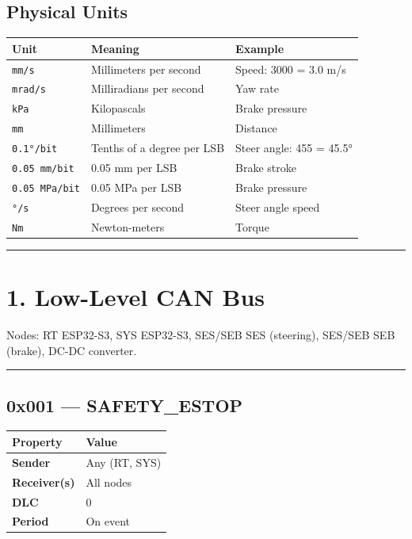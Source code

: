 \subsection{Physical Units}\label{physical-units}

\begin{longtable}[]{@{}lll@{}}
\toprule\noalign{}
Unit & Meaning & Example \\
\midrule\noalign{}
\endhead
\bottomrule\noalign{}
\endlastfoot
\texttt{mm/s} & Millimeters per second & Speed: 3000 = 3.0 m/s \\
\texttt{mrad/s} & Milliradians per second & Yaw rate \\
\texttt{kPa} & Kilopascals & Brake pressure \\
\texttt{mm} & Millimeters & Distance \\
\texttt{0.1°/bit} & Tenths of a degree per LSB & Steer angle: 455 = 45.5° \\
\texttt{0.05\ mm/bit} & 0.05 mm per LSB & Brake stroke \\
\texttt{0.05\ MPa/bit} & 0.05 MPa per LSB & Brake pressure \\
\texttt{°/s} & Degrees per second & Steer angle speed \\
\texttt{Nm} & Newton-meters & Torque \\
\end{longtable}

\begin{center}\rule{0.5\linewidth}{0.5pt}\end{center}

\section{1. Low-Level CAN Bus}\label{low-level-can-bus}

Nodes: RT ESP32-S3, SYS ESP32-S3, SES/SEB SES (steering), SES/SEB SEB (brake),
DC-DC converter.

\begin{center}\rule{0.5\linewidth}{0.5pt}\end{center}

\subsection{0x001 --- SAFETY\_ESTOP}\label{x001-safety_estop}

\begin{longtable}[]{@{}ll@{}}
\toprule\noalign{}
Property & Value \\
\midrule\noalign{}
\endhead
\bottomrule\noalign{}
\endlastfoot
\textbf{Sender} & Any (RT, SYS) \\
\textbf{Receiver(s)} & All nodes \\
\textbf{DLC} & 0 \\
\textbf{Period} & On event \\
\end{longtable}

